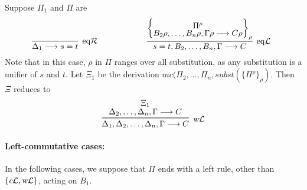 \documentclass[preprint]{elsarticle}
\newcommand{\Seq}[2]{#1\longrightarrow #2}
\newcommand{\cL}{\hbox{\sl c}{\cal L}}
\newcommand{\eqL}{{\rm eq}{\cal L}}
\newcommand{\eqR}{{\rm eq}{\cal R}}
\newcommand{\wL}{\hbox{\sl w}{\cal L}}
\begin{document}
\begin{trivlist}
\item[\fbox{$\eqR/\eqL$}] 
Suppose $\Pi_1$ and $\Pi$ are
  \begin{displaymath}
    \infer[\eqR]{\Seq{\Delta_1}{s = t}}
    {}
    \qquad\qquad\qquad
    \infer[\eqL]{\Seq{s=t,B_2,\ldots,B_n,\Gamma}{C}}
    {\left\{\raisebox{-1.5ex}
        {\deduce{\Seq{B_2\rho,\ldots,B_n\rho,\Gamma\rho}
            {C\rho}}
          {\Pi^\rho}}
      \right\}_\rho}
    \enspace 
  \end{displaymath}
  Note that in this case, $\rho$ in $\Pi$ ranges over all
  substitution, as any substitution is a unifier of $s$ and $t$.  Let
  $\Xi_1$ be the derivation
  $mc(\Pi_2,\ldots,\Pi_n,subst(\{\Pi^\rho\}_\rho)$. Then $\Xi$
  reduces to
  $$
  \infer=[\wL]
  {\Seq{\Delta_1,\Delta_2,\ldots,\Delta_n,\Gamma}{C}}
  {\deduce{\Seq{\Delta_2,\ldots,\Delta_n,\Gamma}{C}}{\Xi_1}}
  $$



\end{trivlist}

\paragraph{Left-commutative cases:}

In the following cases, we suppose that $\Pi$ ends with a left rule,
other than $\{\cL, \wL\}$, acting on $B_1$.
\end{document}
